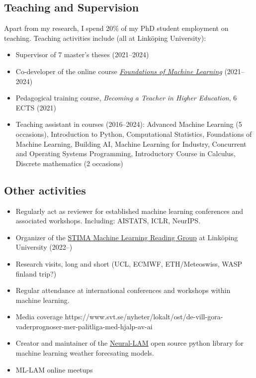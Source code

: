 \documentclass[12pt]{article}
\newcommand{\cvheading}[1]{\subsection*{#1}}
\begin{document}
\cvheading{Teaching and Supervision}
    Apart from my research, I spend 20\% of my PhD student employment on teaching. Teaching activities include (all at Linköping University):
    \begin{itemize}
        \item Supervisor of 7 master's theses (2021--2024)
        \item Co-developer of the online course \href{https://foundations-of-ml.ida.liu.se/}{\textit{Foundations of Machine Learning}} (2021--2024)
        \item Pedagogical training course, \textit{Becoming a Teacher in Higher Education}, 6 ECTS (2021)
        \item Teaching assistant in courses (2016--2024):
            Advanced Machine Learning (5 occasions),
            Introduction to Python,
            Computational Statistics,
            Foundations of Machine Learning,
            Building AI,
            Machine Learning for Industry,
            Concurrent and Operating Systems Programming,
            Introductory Course in Calculus,
            Discrete mathematics (2 occasions)
    \end{itemize}

\cvheading{Other activities}
\begin{itemize}
    \item Regularly act as reviewer for established machine learning conferences and associated workshops. Including:
        AISTATS,
        ICLR,
        NeurIPS.
    \item Organizer of the \href{https://github.com/STIMALiU/ml-reading-group}{STIMA Machine Learning Reading Group} at Linköping University (2022--)
    \item Research visits, long and short (UCL, ECMWF, ETH/Meteoswiss, WASP finland trip?)
    \item Regular attendance at international conferences and workshops within machine learning.
    \item Media coverage https://www.svt.se/nyheter/lokalt/ost/de-vill-gora-vaderprognoser-mer-palitliga-med-hjalp-av-ai
    \item Creator and maintainer of the \href{https://github.com/mllam/neural-lam}{Neural-LAM} open source python library for machine learning weather forecsating models.
    \item ML-LAM online meetups
\end{itemize}
\end{document}
